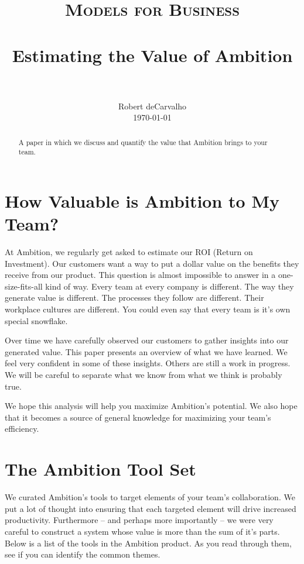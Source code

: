 \documentclass[paper=a4, fontsize=11pt abstract]{scrartcl}
\title{
		\usefont{OT1}{bch}{b}{n}
		\normalfont \normalsize \textsc{Models for Business} \\ [25pt]
		\horrule{0.5pt} \\[0.4cm]
		\huge Estimating the Value of Ambition\\
		\horrule{2pt} \\[0.5cm]
}
\author{
		\normalfont
		\normalsize
        Robert deCarvalho\\[-3pt]
        \normalsize
        \today
}
\date{}
\numberwithin{equation}{section}		%
\numberwithin{figure}{section}			%
\numberwithin{table}{section}				%
\begin{document}
\maketitle


\begin{abstract}
A paper in which we discuss and quantify the value that Ambition brings to your team.
\end{abstract}


\section{How Valuable is Ambition to My Team?}

At Ambition, we regularly get asked to estimate our ROI (Return on Investment).
Our customers want a way to put a dollar value on the benefits they receive from our product.
This question is almost impossible to answer in a one-size-fits-all kind of way.
Every team at every company is different.
The way they generate value is different.
The processes they follow are different.
Their workplace cultures are different.
You could even say that every team is it's own special snowflake.

Over time we have carefully observed our customers to gather insights into our generated value.
This paper presents an overview of what we have learned.
We feel very confident in some of these insights.  
Others are still a work in progress.
We will be careful to separate what we know from what we think is probably true.


We hope this analysis will help you maximize Ambition's potential.
We also hope that it becomes a source of general knowledge for maximizing your team's efficiency.

\section{The Ambition Tool Set}
We curated Ambition's tools to target elements of your team's collaboration.  We put a lot of thought into ensuring that each targeted element will drive increased productivity.
Furthermore -- and perhaps more importantly -- we were very careful to construct a system whose value is more than the sum of it's parts.
Below is a list of the tools in the Ambition product.
As you read through them, see if you can identify the common themes.
\end{document}
